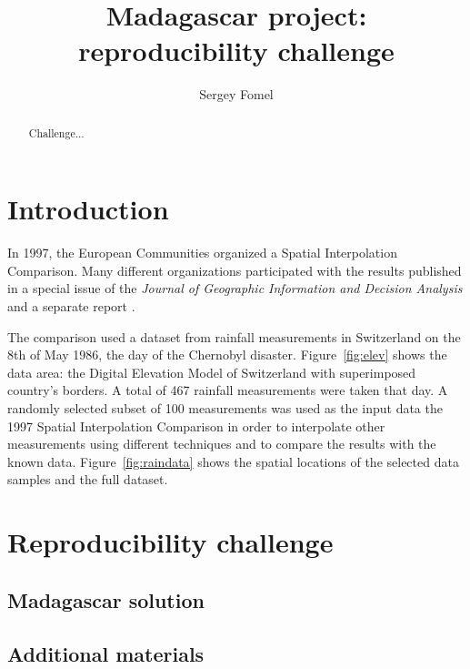 \title{Madagascar project: reproducibility challenge}

\author{Sergey Fomel}

\begin{abstract}
Challenge...
\end{abstract}


\address {
sergey.fomel@beg.utexas.edu \\
Jackson School of Geosciences \\
The University of Texas at Austin \\ 
University Station, Box X \\
Austin, TX 78713-8924 \\
USA}

\maketitle

\section{Introduction}

In 1997, the European Communities organized a Spatial Interpolation
Comparison. Many different organizations participated with the results
published in a special issue of the \emph{Journal of Geographic
Information and Decision Analysis} \cite[]{dubois} and a separate
report \cite[]{rain}.


The comparison used a dataset from rainfall measurements in
Switzerland on the 8th of May 1986, the day of the Chernobyl disaster.
Figure~\ref{fig:elev} shows the data area: the Digital Elevation Model
of Switzerland with superimposed country's borders.  A total of 467
rainfall measurements were taken that day. A randomly selected subset
of 100 measurements was used as the input data the 1997 Spatial
Interpolation Comparison in order to interpolate other measurements
using different techniques and to compare the results with the known
data. Figure~\ref{fig:raindata} shows the spatial locations of the
selected data samples and the full dataset.


\section{Reproducibility challenge}

\subsection{Madagascar solution}

\subsection{Additional materials}



